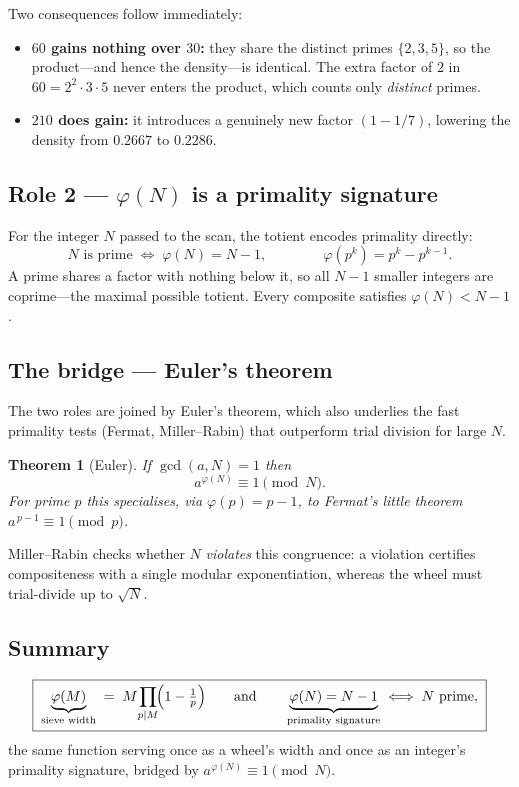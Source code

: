 \documentclass[11pt]{article}
\newtheorem{theorem}{Theorem}
\theoremstyle{definition}
\begin{document}
\noindent Two consequences follow immediately:
\begin{itemize}
  \item \textbf{$60$ gains nothing over $30$:} they share the distinct
        primes $\{2,3,5\}$, so the product---and hence the density---is
        identical. The extra factor of $2$ in $60=2^2\cdot3\cdot5$ never
        enters the product, which counts only \emph{distinct} primes.
  \item \textbf{$210$ does gain:} it introduces a genuinely new factor
        $(1-1/7)$, lowering the density from $0.2667$ to $0.2286$.
\end{itemize}

\subsection*{Role 2 --- $\varphi(N)$ is a primality signature}

For the integer $N$ passed to the scan, the totient encodes primality
directly:
\[
N \text{ is prime} \;\Longleftrightarrow\; \varphi(N) = N-1,
\qquad\qquad
\varphi(p^k) = p^k - p^{k-1}.
\]
A prime shares a factor with nothing below it, so all $N-1$ smaller
integers are coprime---the maximal possible totient. Every composite
satisfies $\varphi(N) < N-1$.

\subsection*{The bridge --- Euler's theorem}

The two roles are joined by Euler's theorem, which also underlies the
fast primality tests (Fermat, Miller--Rabin) that outperform trial
division for large $N$.

\begin{theorem}[Euler]
If $\gcd(a,N)=1$ then
\[
a^{\varphi(N)} \equiv 1 \pmod{N}.
\]
For prime $p$ this specialises, via $\varphi(p)=p-1$, to Fermat's little
theorem $a^{\,p-1}\equiv 1 \pmod p$.
\end{theorem}

Miller--Rabin checks whether $N$ \emph{violates} this congruence: a
violation certifies compositeness with a single modular exponentiation,
whereas the wheel must trial-divide up to $\sqrt N$.

\subsection*{Summary}

\[
\boxed{\;
\underbrace{\varphi(M)}_{\text{sieve width}}
\;=\; M\!\prod_{p\mid M}\!\Bigl(1-\tfrac1p\Bigr)
\qquad\text{and}\qquad
\underbrace{\varphi(N)=N-1}_{\text{primality signature}}
\;\Longleftrightarrow\; N \text{ prime},
\;}
\]
the same function serving once as a wheel's width and once as an integer's
primality signature, bridged by $a^{\varphi(N)}\equiv 1 \pmod N$.
\end{document}
